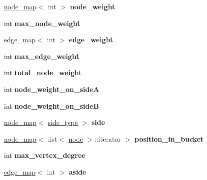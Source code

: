 \begin{DoxyCompactItemize}
\mbox{\hyperlink{classnode__map}{node\+\_\+map}}$<$ int $>$ {\bfseries node\+\_\+weight}
\item 
\mbox{\label{classfm__partition_a8591f5eddac01679e1da3d835eae1cf6}} 
int {\bfseries max\+\_\+node\+\_\+weight}
\item 
\mbox{\label{classfm__partition_adfe6147ba3f9c785f613b472f950595f}} 
\mbox{\hyperlink{classedge__map}{edge\+\_\+map}}$<$ int $>$ {\bfseries edge\+\_\+weight}
\item 
\mbox{\label{classfm__partition_a5b37b4ac8d96236f274a57a46d653e25}} 
int {\bfseries max\+\_\+edge\+\_\+weight}
\item 
\mbox{\label{classfm__partition_a25651e3f78ddbc418ea978ca6b28e0e0}} 
int {\bfseries total\+\_\+node\+\_\+weight}
\item 
\mbox{\label{classfm__partition_a8a50d15b399c9ed35d6987c8fb68aa2b}} 
int {\bfseries node\+\_\+weight\+\_\+on\+\_\+sideA}
\item 
\mbox{\label{classfm__partition_a6dc967e385b31096a85f17c51f1f0824}} 
int {\bfseries node\+\_\+weight\+\_\+on\+\_\+sideB}
\item 
\mbox{\label{classfm__partition_af83309e781e9658fc0ff923ced087bfc}} 
\mbox{\hyperlink{classnode__map}{node\+\_\+map}}$<$ \mbox{\hyperlink{classfm__partition_a7cdff1bea3740a287387e8408e16ca79}{side\+\_\+type}} $>$ {\bfseries side}
\item 
\mbox{\label{classfm__partition_a7cbed9aeba4dae80047b45849e61bfa5}} 
\mbox{\hyperlink{classnode__map}{node\+\_\+map}}$<$ list$<$ \mbox{\hyperlink{classnode}{node}} $>$\+::iterator $>$ {\bfseries position\+\_\+in\+\_\+bucket}
\item 
\mbox{\label{classfm__partition_ab6a4beaa10548ce9f1a0e8e441492ef9}} 
int {\bfseries max\+\_\+vertex\+\_\+degree}
\item 
\mbox{\label{classfm__partition_a14b0aa9a91a6e7fa3035669cf5056275}} 
\mbox{\hyperlink{classedge__map}{edge\+\_\+map}}$<$ int $>$ {\bfseries aside}

\end{DoxyCompactItemize}
